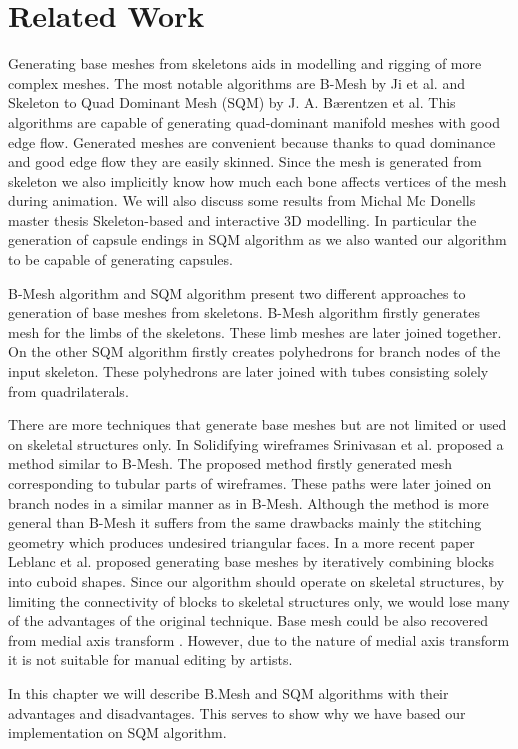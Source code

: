 \chapter{Related Work}
Generating base meshes from skeletons aids in modelling and rigging of more complex meshes. The most notable algorithms are B-Mesh by Ji et al. \cite{ji_bm} and Skeleton to Quad Dominant Mesh (SQM) by J. A. Bærentzen et al. \cite{sqm} This algorithms are capable of generating quad-dominant manifold meshes with good edge flow. Generated meshes are convenient because thanks to quad dominance and good edge flow they are easily skinned. Since the mesh is generated from skeleton we also implicitly know how much each bone affects vertices of the mesh during animation. We will also discuss some results from Michal Mc Donells master thesis Skeleton-based and interactive 3D modelling\cite{sqm_phd}. In particular the generation of capsule endings in SQM algorithm as we also wanted our algorithm to be capable of generating capsules.

B-Mesh algorithm and SQM algorithm present two different approaches to generation of base meshes from skeletons. B-Mesh algorithm firstly generates mesh for the limbs of the skeletons. These limb meshes are later joined together. On the other SQM algorithm firstly creates polyhedrons for branch nodes of the input skeleton. These polyhedrons are later joined with tubes consisting solely from quadrilaterals.

There are more techniques that generate base meshes but are not limited or used on skeletal structures only.
In Solidifying wireframes Srinivasan et al. \cite{wireframes} proposed a method similar to B-Mesh.
The proposed method firstly generated mesh corresponding to tubular parts of wireframes.
These paths were later joined on branch nodes in a similar manner as in B-Mesh.
Although the method is more general than B-Mesh it suffers from the same drawbacks mainly the stitching geometry which produces undesired triangular faces.
In a more recent paper Leblanc et al. \cite{blocks} proposed generating base meshes by iteratively combining blocks into cuboid shapes.
Since our algorithm should operate on skeletal structures, by limiting the connectivity of blocks to skeletal structures only, we would lose many of the advantages of the original technique.
Base mesh could be also recovered from medial axis transform \cite{mat}.
However, due to the nature of medial axis transform it is not suitable for manual editing by artists.

In this chapter we will describe B.Mesh and SQM algorithms with their advantages and disadvantages. This serves to show why we have based our implementation on SQM algorithm.

